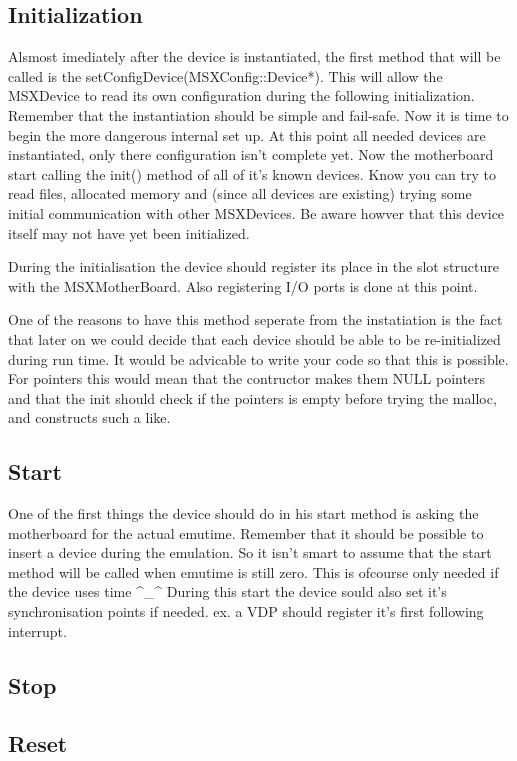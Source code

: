 \documentclass[11pt, a4paper]{report}
\begin{document}
\begin{itemize}
\subsection{Initialization}
Alsmost imediately after the device is instantiated, the first method that will be called is the setConfigDevice(MSXConfig::Device*). This will allow the MSXDevice to read its own configuration during the following initialization. Remember that the instantiation should be simple and fail-safe. Now it is time to begin the more dangerous internal set up. At this point all needed devices are instantiated, only there configuration isn't complete yet. Now the motherboard start calling the init() method of all of it's known devices. 
Know you can try to read files, allocated memory and (since all devices are existing) trying some initial communication with other MSXDevices. Be aware howver that this device itself may not have yet been initialized.

During the initialisation the device should register its place in the slot structure with the MSXMotherBoard. Also registering I/O ports is done at this point.

One of the reasons to have this method seperate from the instatiation is the fact that later on we could decide that each device should be able to be re-initialized during run time. It would be advicable to write your code so that this is possible. For pointers this would mean that the contructor makes them NULL pointers and that the init should check if the pointers is empty before trying the malloc, and constructs such a like.

\subsection{Start}
One of the first things the device should do in his start method is asking the motherboard for the actual emutime. Remember that it should be possible to insert a device during the emulation. So it isn't smart to assume that the start method will be called when emutime is still zero. This is ofcourse only needed if the device uses time ^_^
During this start the device sould also set it's synchronisation points if needed. ex. a VDP should register it's first following interrupt.

\subsection{Stop}
\subsection{Reset}


\end{itemize}
\end{document}
